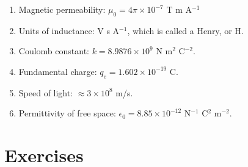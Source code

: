 \documentclass[10pt]{article}
\begin{document}
\begin{enumerate}
\item Magnetic permeability: $\mu_0 = 4\pi \times 10^{-7}$ T m A$^{-1}$
\item Units of inductance: V s A$^{-1}$, which is called a Henry, or H.
\item Coulomb constant: $k = 8.9876 \times 10^{9}$ N m$^2$ C$^{-2}$.
\item Fundamental charge: $q_e = 1.602 \times 10^{-19}$ C.
\item Speed of light: $\approx 3 \times 10^{8}$ m/s.
\item Permittivity of free space: $\epsilon_0 = 8.85 \times 10^{-12}$ N$^{-1}$ C$^2$ m$^{-2}$.
\end{enumerate}

\clearpage

\section{Exercises}
\end{document}
